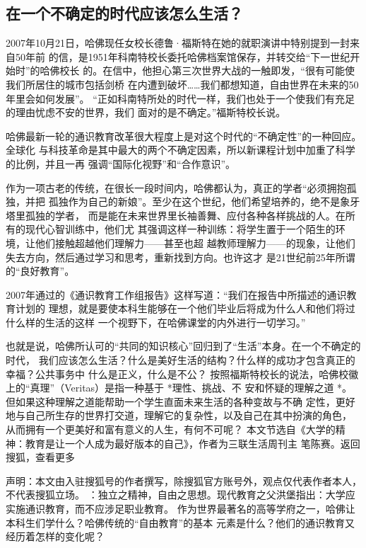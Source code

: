 \documentclass[11pt]{ctexart}
\begin{document}
{{{{\subsection{在一个不确定的时代应该怎么生活？}
\label{sec:orga7ca51e}
2007年10月21日，哈佛现任女校长德鲁·福斯特在她的就职演讲中特别提到一封来自50年前
的信，是1951年科南特校长委托哈佛档案馆保存，并转交给“下一世纪开始时”的哈佛校长
的。在信中，他担心第三次世界大战的一触即发，“很有可能使我们所居住的城市包括剑桥
在内遭到破坏……我们都想知道，自由世界在未来的50年里会如何发展”。
“正如科南特所处的时代一样，我们也处于一个使我们有充足的理由忧虑不安的世界，我们
面对的是不确定。”福斯特校长说。

哈佛最新一轮的通识教育改革很大程度上是对这个时代的“不确定性”的一种回应。全球化
与科技革命是其中最大的两个不确定因素，所以新课程计划中加重了科学的比例，并且一再
强调“国际化视野”和“合作意识”。

作为一项古老的传统，在很长一段时间内，哈佛都认为，真正的学者“必须拥抱孤独，并把
孤独作为自己的新娘”。至少在这个世纪，他们希望培养的，绝不是象牙塔里孤独的学者，
而是能在未来世界里长袖善舞、应付各种各样挑战的人。在所有的现代心智训练中，他们尤
其强调这样一种训练：将学生置于一个陌生的环境，让他们接触超越他们理解力——甚至也超
越教师理解力——的现象，让他们失去方向，然后通过学习和思考，重新找到方向。也许这才
是21世纪前25年所谓的“良好教育”。

2007年通过的《通识教育工作组报告》这样写道：“我们在报告中所描述的通识教育计划的
理想，就是要使本科生能够在一个他们毕业后将成为什么人和他们将过什么样的生活的这样
一个视野下，在哈佛课堂的内外进行一切学习。”

也就是说，哈佛所认可的“共同的知识核心”回归到了“生活”本身。在一个不确定的时代，
我们应该怎么生活？什么是美好生活的结构？什么样的成功才包含真正的幸福？公共事务中
什么是正义，什么是不公？
按照福斯特校长的说法，哈佛校徽上的“真理”（Veritas）是指一种基于 *理性、挑战、不
安和怀疑的理解之道 *。但如果这种理解之道能帮助一个学生直面未来生活的各种变故与不确
定性，更好地与自己所生存的世界打交道，理解它的复杂性，以及自己在其中扮演的角色，
从而拥有一个更美好和富有意义的人生，有何不可呢？
本文节选自《大学的精神：教育是让一个人成为最好版本的自己》，作者为三联生活周刊主
笔陈赛。返回搜狐，查看更多

声明：本文由入驻搜狐号的作者撰写，除搜狐官方账号外，观点仅代表作者本人，不代表搜狐立场。
：独立之精神，自由之思想。现代教育之父洪堡指出：大学应实施通识教育，而不应涉足职业教育。
作为世界最著名的高等学府之一，哈佛让本科生们学什么？哈佛传统的“自由教育”的基本
元素是什么？他们的通识教育又经历着怎样的变化呢？



}}}}
\end{document}
